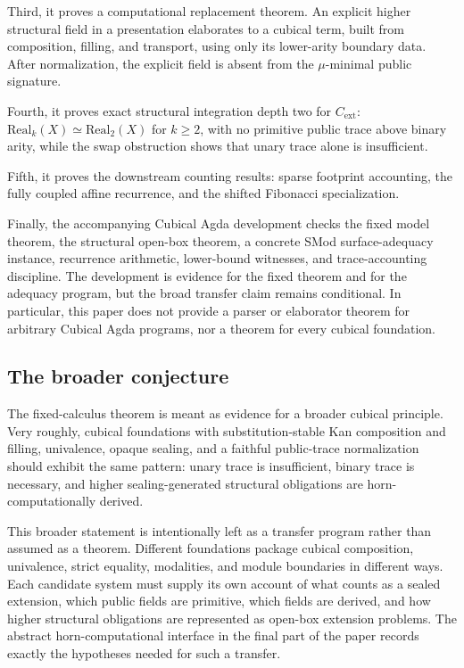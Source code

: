 Third, it proves a computational replacement theorem.  An explicit higher
structural field in a presentation elaborates to a cubical term, built from
composition, filling, and transport, using only its lower-arity boundary data.
After normalization, the explicit field is absent from the \(\mu\)-minimal public
signature.

Fourth, it proves exact structural integration depth two for \(C_{\mathrm{ext}}\):
\(\mathrm{Real}_k(X) \simeq \mathrm{Real}_2(X)\) for \(k\geq 2\), with no
primitive public trace above binary arity, while the swap obstruction shows that
unary trace alone is insufficient.

Fifth, it proves the downstream counting results: sparse footprint accounting,
the fully coupled affine recurrence, and the shifted Fibonacci specialization.

Finally, the accompanying Cubical Agda development checks the fixed model
theorem, the structural open-box theorem, a concrete SMod surface-adequacy
instance, recurrence arithmetic, lower-bound witnesses, and trace-accounting
discipline.  The development is evidence for the fixed theorem and for the
adequacy program, but the broad transfer claim remains conditional.  In
particular, this paper does not provide a parser or elaborator theorem for
arbitrary Cubical Agda programs, nor a theorem for every cubical foundation.

\subsection{The broader conjecture}

The fixed-calculus theorem is meant as evidence for a broader cubical principle.
Very roughly, cubical foundations with substitution-stable Kan composition and
filling, univalence, opaque sealing, and a faithful public-trace normalization
should exhibit the same pattern: unary trace is insufficient, binary trace is
necessary, and higher sealing-generated structural obligations are
horn-computationally derived.

This broader statement is intentionally left as a transfer program rather than
assumed as a theorem.  Different foundations package cubical composition,
univalence, strict equality, modalities, and module boundaries in different ways.
Each candidate system must supply its own account of what counts as a sealed
extension, which public fields are primitive, which fields are derived, and how
higher structural obligations are represented as open-box extension problems.
The abstract horn-computational interface in the final part of the paper records
exactly the hypotheses needed for such a transfer.

